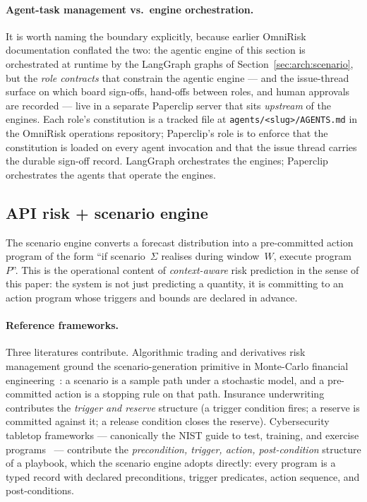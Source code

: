 \documentclass[11pt,a4paper]{article}
\begin{document}
\paragraph{Agent-task management vs.\ engine orchestration.} It is worth
naming the boundary explicitly, because earlier OmniRisk documentation
conflated the two: the agentic engine of this section is orchestrated at
runtime by the LangGraph graphs of Section~\ref{sec:arch:scenario}, but the
\emph{role contracts} that constrain the agentic engine --- and the
issue-thread surface on which board sign-offs, hand-offs between roles,
and human approvals are recorded --- live in a separate Paperclip server
that sits \emph{upstream} of the engines. Each role's constitution is a
tracked file at \texttt{agents/<slug>/AGENTS.md} in the OmniRisk operations
repository; Paperclip's role is to enforce that the constitution is loaded
on every agent invocation and that the issue thread carries the durable
sign-off record. LangGraph orchestrates the engines; Paperclip orchestrates
the agents that operate the engines.

\subsection{API risk + scenario engine}\label{sec:engine:scenario}

The scenario engine converts a forecast distribution into a pre-committed action
program of the form ``if scenario~$\Sigma$ realises during window~$W$, execute
program~$P$''. This is the operational content of \emph{context-aware} risk
prediction in the sense of this paper: the system is not just predicting a
quantity, it is committing to an action program whose triggers and bounds are
declared in advance.

\paragraph{Reference frameworks.} Three literatures contribute. Algorithmic
trading and derivatives risk management ground the scenario-generation primitive in
Monte-Carlo financial engineering~\cite{glasserman2003monte}: a scenario is a
sample path under a stochastic model, and a pre-committed action is a stopping rule
on that path. Insurance underwriting contributes the \emph{trigger and reserve}
structure (a trigger condition fires; a reserve is committed against it; a release
condition closes the reserve). Cybersecurity tabletop frameworks --- canonically the
NIST guide to test, training, and exercise programs~\cite{nist2006sp80084} ---
contribute the \emph{precondition, trigger, action, post-condition} structure of a
playbook, which the scenario engine adopts directly: every program is a typed
record with declared preconditions, trigger predicates, action sequence, and
post-conditions.
\end{document}

